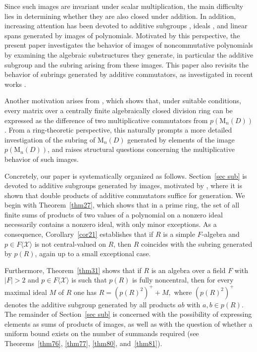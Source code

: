 \documentclass[11pt]{article}
\theoremstyle{definition}
\begin{document}
{{{{			Since such images are invariant under scalar multiplication, the main difficulty lies in determining whether they are also closed under addition. In addition, increasing attention has been devoted to additive subgroups \cite{Pa_Chu_87,  Pa_Lee_23,  Pa_Lee_22}, ideals \cite[Section 3]{Pa_Lee_22}, and linear spans \cite{Pa_Bre_20,Pa_Bre_23,Pa_Bre_23_1} generated by images of polynomials. Motivated by this perspective, the present paper investigates the behavior of images of noncommutative polynomials by examining the algebraic substructures they generate, in particular the additive subgroup and the subring arising from these images.  This paper also revisits the behavior of subrings generated by additive commutators, as investigated in recent works \cite{Pa_Er_22, Pa_Ga_25}.
			
		Another motivation arises from \cite[Theorem~4.9]{Pa_PaSo_26}, which shows that, under suitable conditions, every matrix over a centrally finite algebraically closed division ring can be expressed as the difference of two multiplicative commutators from $p(\mathrm{M}_n(D))$. From a ring-theoretic perspective, this naturally prompts a more detailed investigation of the subring of $\mathrm{M}_n(D)$ generated by elements of the image $p(\mathrm{M}_n(D))$, and raises structural questions concerning the multiplicative behavior of such images.
			
			
			Concretely, our paper is systematically organized as follows.  Section~\ref{sec sub} is devoted to additive subgroups generated by images, motivated by \cite{Pa_Ga_25}, where it is shown that double products of additive commutators suffice for generation. We begin with Theorem~\ref{thm27}, which shows that in a prime ring, the set of all finite sums of products of two values of a polynomial on a nonzero ideal necessarily contains a nonzero ideal, with only minor exceptions. As a consequence, Corollary~\ref{cor21} establishes that if $R$ is a simple $F$-algebra and $p\in F\langle\mathcal{X}\rangle$ is not central-valued on $R$, then $R$ coincides with the subring generated by $p(R)$, again up to a small exceptional case.
		
		Furthermore, Theorem~\ref{thm31} shows that if $R$ is an algebra over a field $F$ with $|F|>2$ and $p\in F\langle\mathcal{X}\rangle$ is such that $p(R)$ is fully noncentral, then for every maximal ideal $M$ of $R$ one has
		$
		R=(p(R)^2)^+ + M,
		$
		where $(p(R)^2)^+$ denotes the additive subgroup generated by all products $ab$ with $a,b\in p(R)$. The remainder of Section~\ref{sec sub} is concerned with the possibility of expressing elements as sums of products of images, as well as with the question of whether a uniform bound exists on the number of summands required (see Theorems~\ref{thm76}, \ref{thm77}, \ref{thm80}, and~\ref{thm81}).
		

}}}}
\end{document}
